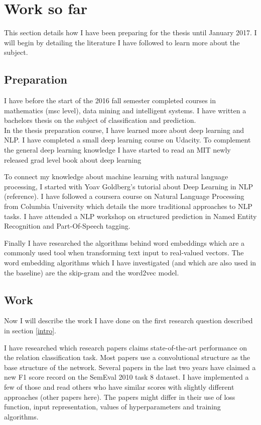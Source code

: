 \documentclass[12pt]{article}
\begin{document}
\section{Work so far}

This section details how I have been preparing for the thesis until January 2017.
I will begin by detailing the literature I have followed to learn more about the subject.

\subsection{Preparation}
I have before the start of the 2016 fall semester completed courses in mathematics (msc level), data mining and intelligent systems. I have written a bachelors thesis on the subject of classification and prediction.\\

In the thesis preparation course, I have learned more about deep learning and NLP. I have completed
a small deep learning course on Udacity\cite{udacity}.
To complement the general deep learning knowledge I have started to read an MIT newly released 
grad level book about deep learning\cite{dlbook}

To connect my knowledge about machine learning with natural language processing, I started with Yoav Goldberg's tutorial about Deep Learning in NLP (reference). I have followed a coursera course on Natural Language Processing from Columbia University which details the more traditional approaches to NLP tasks. I have attended a NLP workshop on structured prediction in Named Entity Recognition and Part-Of-Speech tagging. 

Finally I have researched the algorithms behind word embeddings which are a commonly used tool when transforming text input to real-valued vectors. The word embedding algorithms which I have investigated (and which are also used in the baseline) are the skip-gram and the word2vec model\cite{skipgram}.

\subsection{Work}
Now I will describe the work I have done on the first research question described in section \ref{intro}.

I have researched which research papers claims state-of-the-art performance on the relation classification task. Most papers use a convolutional structure as the base structure of the network. Several papers in the last two years have claimed a new F1 score record on the SemEval 2010 task 8 dataset. I have implemented a few of those\cite{att_cnn}\cite{re_cnn} and read others who have similar scores with slightly different approaches (other papers here). The papers might differ in their use of loss function, input representation, values of hyperparameters and training algorithms.
\end{document}
